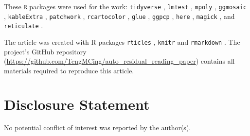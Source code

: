 \documentclass[]{interact}
\theoremstyle{plain}%
\theoremstyle{definition}
\theoremstyle{remark}
\begin{document}
These \texttt{R} packages were used for the work: \texttt{tidyverse}
\citep{tidyverse}, \texttt{lmtest} \citep{lmtest}, \texttt{mpoly}
\citep{mpoly}, \texttt{ggmosaic} \citep{ggmosaic}, \texttt{kableExtra}
\citep{kableextra}, \texttt{patchwork} \citep{patchwork},
\texttt{rcartocolor} \citep{rcartocolor}, \texttt{glue} \citep{glue},
\texttt{ggpcp} \citep{ggpcp}, \texttt{here} \citep{here},
\texttt{magick} \citep{magick}, and \texttt{reticulate}
\citep{reticulate}.

The article was created with R packages \texttt{rticles}
\citep{rticles}, \texttt{knitr} \citep{knitr} and \texttt{rmarkdown}
\citep{rmarkdown}. The project's GitHub repository
(\url{https://github.com/TengMCing/auto_residual_reading_paper})
contains all materials required to reproduce this article.

\section*{Disclosure Statement}\label{disclosure-statement}

No potential conflict of interest was reported by the author(s).



\end{document}
